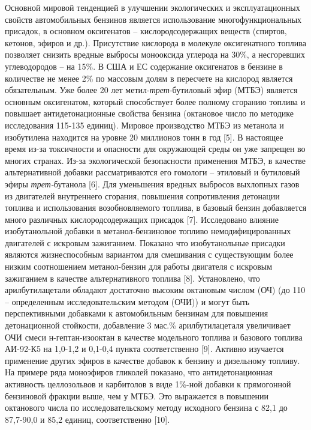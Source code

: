 Основной мировой тенденцией в улучшении экологических и эксплуатационных
свойств автомобильных бензинов является использование
многофункциональных присадок, в основном оксигенатов --
кислородсодержащих веществ (спиртов, кетонов, эфиров и др.). Присутствие
кислорода в молекуле оксигенатного топлива позволяет снизить вредные
выбросы монооксида углерода на 30\%, а несгоревших углеводородов -- на
15\%. В США и ЕС содержание оксигенатов в бензине в количестве не менее
2\% по массовым долям в пересчете на кислород является обязательным. Уже
более 20 лет метил-\emph{трет}-бутиловый эфир (МТБЭ) является основным
оксигенатом, который способствует более полному сгоранию топлива и
повышает антидетонационные свойства бензина (октановое число по методике
исследования 115-135 единиц). Мировое производство МТБЭ из метанола и
изобутилена находится на уровне 20 миллионов тонн в год {[}5{]}. В
настоящее время из-за токсичности и опасности для окружающей среды он
уже запрещен во многих странах. Из-за экологической безопасности
применения МТБЭ, в качестве альтернативной добавки рассматриваются его
гомологи -- этиловый и бутиловый эфиры \emph{трет-}бутанола {[}6{]}. Для
уменьшения вредных выбросов выхлопных газов из двигателей внутреннего
сгорания, повышения сопротивления детонации топлива и использования
возобновляемого топлива, в базовый бензин добавляется много различных
кислородсодержащих присадок {[}7{]}. Исследовано влияние изобутанольной
добавки в метанол-бензиновое топливо немодифицированных двигателей с
искровым зажиганием. Показано что изобутанольные присадки являются
жизнеспособным вариантом для смешивания с существующим более низким
соотношением метанол-бензин для работы двигателя с искровым зажиганием в
качестве альтернативного топлива {[}8{]}. Установлено, что
арилбутилацетали обладают достаточно высоким октановым числом (ОЧ) (до
110 -- определенным исследовательским методом (ОЧИ)) и могут быть
перспективными добавками к автомобильным бензинам для повышения
детонационной стойкости, добавление 3 мас.\% арилбутилацеталя
увеличивает ОЧИ смеси н-гептан-изооктан в качестве модельного топлива и
базового топлива АИ-92-К5 на 1,0-1,2 и 0,1-0,4 пункта соответственно
{[}9{]}. Активно изучается применение других эфиров в качестве добавок к
бензину и дизельному топливу. На примере ряда моноэфиров гликолей
показано, что антидетонационная активность целлозольвов и карбитолов в
виде 1\%-ной добавки к прямогонной бензиновой фракции выше, чем у МТБЭ.
Это выражается в повышении октанового числа по исследовательскому методу
исходного бензина с 82,1 до 87,7-90,0 и 85,2 единиц, соответственно
{[}10{]}. \hl{}


